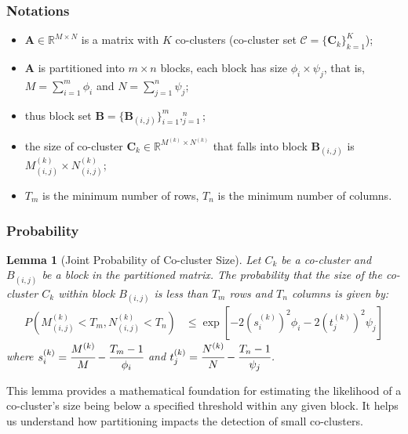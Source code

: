 \documentclass[journal]{IEEEtran}
\newtheorem{lemma}{Lemma}
\begin{document}
\subsubsection{Notations}
\label{subsec:probability}
\begin{itemize}
  \item $\mathbf{A} \in \mathbb{R}^{M \times N}$ is a matrix with $K$ co-clusters (co-cluster set $\mathcal{C} = \{\mathbf{C}_k\}_{k=1}^K$);
  \item $\mathbf{A}$ is partitioned into $m \times n$ blocks, each block has size $\phi_i \times \psi_j$, that is, $M=\sum_{i=1}^m \phi_i$ and $N=\sum_{j=1}^n \psi_j$;
  \item thus block set $\mathbf{B} = \{\mathbf{B}_{(i,j)}\}_{i=1}^m,_{j=1}^n$;
  \item the size of co-cluster $\mathbf{C}_k \in \mathbb{R}^{M^{(k)} \times N^{(k)}}$ that falls into block $\mathbf{B}_{(i,j)}$ is $M_{(i,j)}^{(k)} \times N_{(i,j)}^{(k)}$;
  \item $T_m$ is the minimum number of rows, $T_n$ is the minimum number of columns.
\end{itemize}

\subsubsection{Probability}

\begin{lemma}[Joint Probability of Co-cluster Size]
  \label{thm:joint_probability}
  Let $C_k$ be a co-cluster and $B_{(i,j)}$ be a block in the partitioned matrix. The probability that the size of the co-cluster $C_k$ within block $B_{(i,j)}$ is less than $T_m$ rows and $T_n$ columns is given by:
  \begin{align*}
    P(M_{(i,j)}^{(k)} < T_m, N_{(i,j)}^{(k)} < T_n) & \le \exp[-2 (s_i^{(k)})^2 \phi_i -2 (t_j^{(k)})^2 \psi_j]
  \end{align*}
  where $s_i^{(k)} = \cfrac{M^{(k)}}{M}-\cfrac{T_m-1}{\phi_i}$ and $t_j^{(k)} = \cfrac{N^{(k)}}{N}-\cfrac{T_n-1}{\psi_j}$.
\end{lemma}

This lemma provides a mathematical foundation for estimating the likelihood of a co-cluster's size being below a specified threshold within any given block. It helps us understand how partitioning impacts the detection of small co-clusters.
\end{document}
